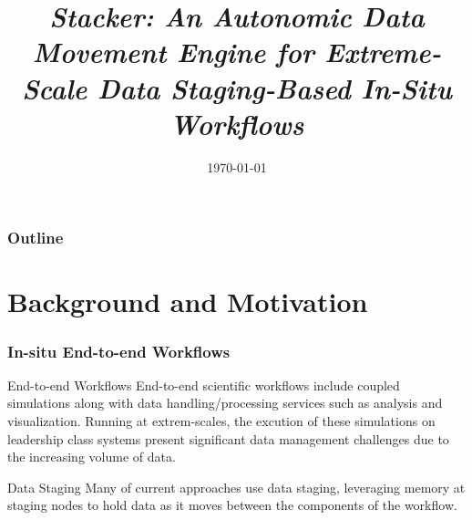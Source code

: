 \documentclass{beamer}
\title[Stacker]{\textit{Stacker: An Autonomic Data Movement Engine for Extreme-Scale Data Staging-Based In-Situ Workﬂows}} %
\author{} %
\institute[] %
{
\medskip
}
\date{\today} %
\begin{document}
\begin{frame}
\titlepage %
\end{frame}

\begin{frame}
\frametitle{Outline} %
\tableofcontents %
\end{frame}


\section{Background and Motivation} %


\begin{frame}
\frametitle{In-situ End-to-end Workflows}
\begin{block}{End-to-end Workflows}
End-to-end scientiﬁc workﬂows include coupled simulations along with data handling/processing services such as analysis and visualization. Running at extrem-scales, the excution of these simulations on leadership class systems present significant data management challenges due to the increasing volume of data.
\end{block}
\begin{block}{Data Staging}
Many of current approaches use data staging, leveraging memory at staging nodes to hold data as it moves between the components of the workﬂow.
\end{block}
\end{frame}
\end{document}

